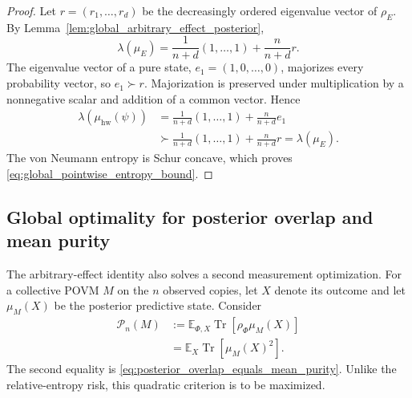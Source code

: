 \documentclass[journal]{IEEEtran}
\begin{document}
\begin{proof}
Let \(r=(r_1,\ldots,r_d)\) be the decreasingly ordered eigenvalue vector of
\(\rho_E\).  By Lemma~\ref{lem:global_arbitrary_effect_posterior},
\begin{equation}
    \lambda(\mu_E)
    =
    \frac{1}{n+d}(1,\ldots,1)
    +
    \frac{n}{n+d}r.
    \label{eq:global_arbitrary_effect_spectrum_affine}
\end{equation}
The eigenvalue vector of a pure state, \(e_1=(1,0,\ldots,0)\), majorizes every
probability vector, so \(e_1\succ r\).  Majorization is preserved under
multiplication by a nonnegative scalar and addition of a common vector.  Hence
\begin{equation}
\begin{split}
    \lambda\!\left(\mu_{\mathrm{hw}}(\psi)\right)
    &=
    \frac{1}{n+d}(1,\ldots,1)
    +
    \frac{n}{n+d}e_1\\
    &\succ
    \frac{1}{n+d}(1,\ldots,1)
    +
    \frac{n}{n+d}r
    =\lambda(\mu_E).
\end{split}
\label{eq:global_pointwise_majorization}
\end{equation}
The von Neumann entropy is Schur concave, which proves
\eqref{eq:global_pointwise_entropy_bound}.
\end{proof}

\subsection{Global optimality for posterior overlap and mean purity}
\label{subsec:global_posterior_overlap_optimality}

The arbitrary-effect identity also solves a second measurement optimization.
For a collective POVM \(M\) on the \(n\) observed copies, let \(X\) denote its
outcome and let \(\mu_M(X)\) be the posterior predictive state.  Consider
\begin{equation}
\begin{split}
    \mathcal P_n(M)
    &:={\mathbb E}_{\Phi,X}
      \operatorname{Tr}[\rho_\Phi\mu_M(X)]\\
    &={\mathbb E}_X\operatorname{Tr}[\mu_M(X)^2].
\end{split}
\label{eq:global_posterior_overlap_criterion}
\end{equation}
The second equality is
\eqref{eq:posterior_overlap_equals_mean_purity}.  Unlike the relative-entropy
risk, this quadratic criterion is to be maximized.
\end{document}
